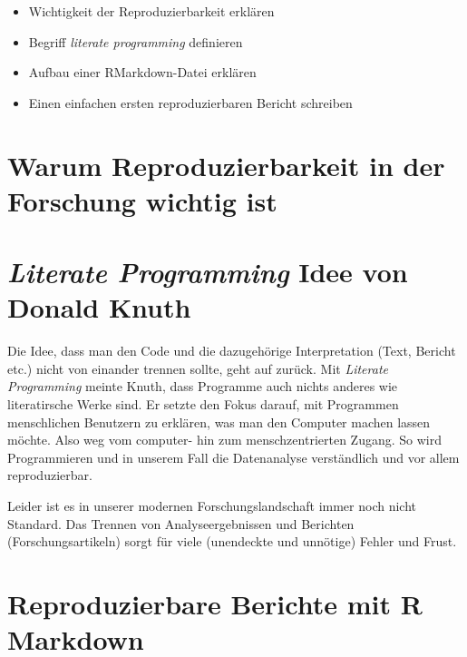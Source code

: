 \documentclass[]{book}
\providecommand{\tightlist}{%
  \setlength{\itemsep}{0pt}\setlength{\parskip}{0pt}}
\newenvironment{rmdoutcomes}{
  \definecolor{outcomes}{rgb}{1.0, 0.92, 0.8}  %
  \color{black}
  \begin{mdframed}[backgroundcolor = outcomes]}
 {\end{mdframed}}
\begin{document}
\begin{rmdoutcomes}
\begin{itemize}
\tightlist
\item
  Wichtigkeit der Reproduzierbarkeit erklären
\item
  Begriff \emph{literate programming} definieren
\item
  Aufbau einer RMarkdown-Datei erklären
\item
  Einen einfachen ersten reproduzierbaren Bericht schreiben
\end{itemize}
\end{rmdoutcomes}

\hypertarget{warum-reproduzierbarkeit-in-der-forschung-wichtig-ist}{%
\section{Warum Reproduzierbarkeit in der Forschung wichtig ist}\label{warum-reproduzierbarkeit-in-der-forschung-wichtig-ist}}

\hypertarget{literate-programming-idee-von-donald-knuth}{%
\section{\texorpdfstring{\emph{Literate Programming} Idee von Donald Knuth}{Literate Programming Idee von Donald Knuth}}\label{literate-programming-idee-von-donald-knuth}}

Die Idee, dass man den Code und die dazugehörige Interpretation (Text, Bericht etc.) nicht von einander trennen sollte, geht auf \citet{Knuth1984} zurück. Mit \emph{Literate Programming} meinte Knuth, dass Programme auch nichts anderes wie literatirsche Werke sind. Er setzte den Fokus darauf, mit Programmen menschlichen Benutzern zu erklären, was man den Computer machen lassen möchte. Also weg vom computer- hin zum menschzentrierten Zugang. So wird Programmieren und in unserem Fall die Datenanalyse verständlich und vor allem reproduzierbar.

Leider ist es in unserer modernen Forschungslandschaft immer noch nicht Standard. Das Trennen von Analyseergebnissen und Berichten (Forschungsartikeln) sorgt für viele (unendeckte und unnötige) Fehler und Frust.

\hypertarget{reproduzierbare-berichte-mit-r-markdown}{%
\section{Reproduzierbare Berichte mit R Markdown}\label{reproduzierbare-berichte-mit-r-markdown}}
\end{document}
